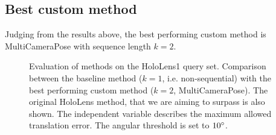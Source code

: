 \documentclass[twoside]{ctuthesis}
\theoremstyle{plain}
\theoremstyle{definition}
\theoremstyle{note}
\begin{document}
\subsection{Best custom method}

Judging from the results above, the best performing custom method is MultiCameraPose with sequence length $k=2$. 

\begin{figure}[htb!]
	\centering
	
	\caption[Translation error threshold vs accuracy on HoloLens1 query set]{Evaluation of methods on the HoloLens1 query set. Comparison between the baseline method ($k=1$, i.e. non-sequential) with the best performing custom method ($k=2$, MultiCameraPose). The original HoloLens method, that we are aiming to surpass is also shown. The independent variable describes the maximum allowed translation error. The angular threshold is set to $10\degree$.}
	\label{fig:HL1-dist-thresh-vs-accuracy}
\end{figure}
\end{document}

